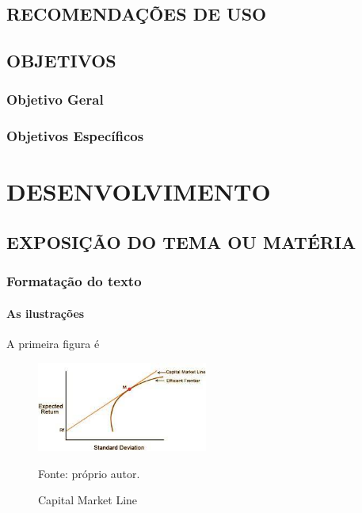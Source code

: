 \documentclass[12pt, a4paper]{article}
\begin{document}
        \subsection{RECOMENDAÇÕES DE USO}

        \subsection{OBJETIVOS}

        \subsubsection{Objetivo Geral}
        
        \subsubsection{Objetivos Específicos}
    
    \section{DESENVOLVIMENTO}
        \subsection{EXPOSIÇÃO DO TEMA OU MATÉRIA}
        \subsubsection{Formatação do texto}
        \paragraph{As ilustrações}

            \noindent A primeira figura é 

            \begin{figure}[htp]
                \centering
                \caption{Capital Market Line}
                \includegraphics[width=0.5\textwidth]{./imagens/cml.jpg}
                \par \footnotesize Fonte: próprio autor.
                \label{fig:cml}
            \end{figure}
\end{document}
